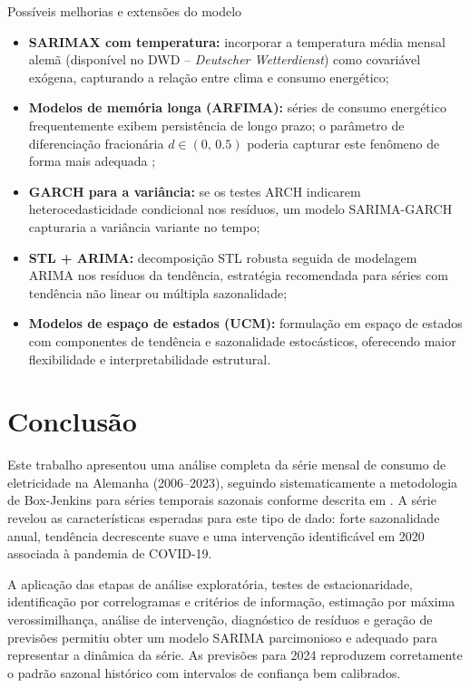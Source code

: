\documentclass[12pt, a4paper]{article}
\begin{document}
\begin{caixaDestaque}{Possíveis melhorias e extensões do modelo}
\begin{itemize}
  \item \textbf{SARIMAX com temperatura:} incorporar a temperatura média mensal alemã
    (disponível no DWD -- \textit{Deutscher Wetterdienst}) como covariável exógena,
    capturando a relação entre clima e consumo energético;
  \item \textbf{Modelos de memória longa (ARFIMA):} séries de consumo energético
    frequentemente exibem persistência de longo prazo; o parâmetro de diferenciação
    fracionária $d \in (0,\, 0.5)$ poderia capturar este fenômeno de forma mais
    adequada \cite{SeriesTemporaisMoretti};
  \item \textbf{GARCH para a variância:} se os testes ARCH indicarem
    heterocedasticidade condicional nos resíduos, um modelo SARIMA-GARCH capturaria
    a variância variante no tempo;
  \item \textbf{STL + ARIMA:} decomposição STL robusta seguida de modelagem ARIMA nos
    resíduos da tendência, estratégia recomendada para séries com tendência não linear
    ou múltipla sazonalidade;
  \item \textbf{Modelos de espaço de estados (UCM):} formulação em espaço de estados
    com componentes de tendência e sazonalidade estocásticos, oferecendo maior
    flexibilidade e interpretabilidade estrutural.
\end{itemize}
\end{caixaDestaque}

\section{Conclusão}
\label{sec:conclusao}

Este trabalho apresentou uma análise completa da série mensal de consumo de
eletricidade na Alemanha (2006--2023), seguindo sistematicamente a metodologia de
Box-Jenkins para séries temporais sazonais conforme descrita em
\textcite{SeriesTemporaisMoretti}. A série revelou as características esperadas para
este tipo de dado: forte sazonalidade anual, tendência decrescente suave e uma
intervenção identificável em 2020 associada à pandemia de COVID-19.

A aplicação das etapas de análise exploratória, testes de estacionaridade,
identificação por correlogramas e critérios de informação, estimação por máxima
verossimilhança, análise de intervenção, diagnóstico de resíduos e geração de
previsões permitiu obter um modelo SARIMA parcimonioso e adequado para representar
a dinâmica da série. As previsões para 2024 reproduzem corretamente o padrão sazonal
histórico com intervalos de confiança bem calibrados.
\end{document}
